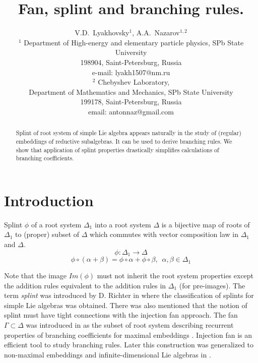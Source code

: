 \documentclass[12pt]{article}
\begin{document}
\title{Fan, splint and branching rules.}



\author{V.D.~Lyakhovsky$^1$, A.A.~Nazarov$^{1,2}$ \\
  {\small $^1$ Department of High-energy and elementary particle physics, SPb State University}\\
  {\small 198904, Saint-Petersburg, Russia}\\
  {\small e-mail: lyakh1507@nm.ru}\\
  {\small$^{2}$ Chebyshev Laboratory,}\\
  {\small Department of Mathematics and Mechanics, SPb State University}\\
  {\small 199178, Saint-Petersburg, Russia}\\
  {\small email: antonnaz@gmail.com}}
\maketitle

\begin{abstract}
Splint of root system of simple Lie algebra appears naturally in
the study of (regular) embeddings of reductive subalgebras. It can
be used to derive branching rules. We show that application of
splint properties drastically simplifies calculations of
branching coefficients.
\end{abstract}

\section{Introduction}
\label{sec:Introduction}

Splint $\phi$ of a root system $\Delta_1$ into a root system
$\Delta$ is a bijective map of roots of $\Delta_{1}$ to (proper)
subset of $\Delta$ which commutes with vector composition law in
$\Delta_{1}$ and $\Delta$.
\begin{equation*}
\phi:\Delta_1 \longrightarrow \Delta
\end{equation*}
\begin{equation*}
\phi \circ (\alpha + \beta) =\phi \circ \alpha + \phi \circ \beta,
\,\,\, \alpha,\beta \in \Delta_1
\end{equation*}

Note that the image $Im(\phi)$ must not inherit the root system
properties except the addition rules equivalent to the addition
rules in $\Delta_{1}$ (for pre-images). The term {\it splint} was
introduced by D. Richter in  \cite{richter2008splints} where the
classification of splints for simple Lie algebras was obtained.
There was also mentioned that the notion of splint must have tight
connections with the injection fan approach. The fan $\Gamma
\subset \Delta$ was
introduced in \cite{lyakhovsky1996rra} as the subset of root system describing recurrent
properties of branching coefficients for maximal embeddings  . Injection fan is an
efficient tool to study branching rules. Later this construction
was generalized to non-maximal embeddings and infinite-dimensional
Lie algebras in \cite{2010arXiv1007.0318L, ilyin812pbc}.
\end{document}
